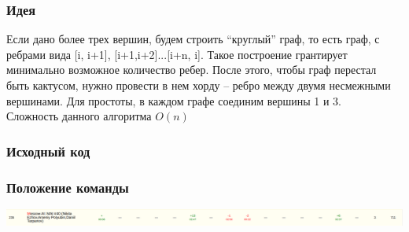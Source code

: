 \documentclass[12pt]{article}
\begin{document}
\subsubsection*{Идея}
Если дано более трех вершин, будем строить “круглый” граф, то есть граф, с ребрами вида [i, i+1], [i+1,i+2]...[i+n, i]. Такое построение 
грантирует минимально возможное количество ребер. После этого, чтобы граф перестал быть кактусом,  нужно провести в нем хорду – ребро между 
двумя несмежными вершинами. Для простоты, в каждом графе соединим вершины 1 и 3.
\\ 
Сложность данного алгоритма $O(n)$
\subsubsection*{Исходный код}

\subsubsection*{Положение команды}
\includegraphics[scale=0.5]{images/QuarterFinal.png}\newline\noindent
\end{document}
